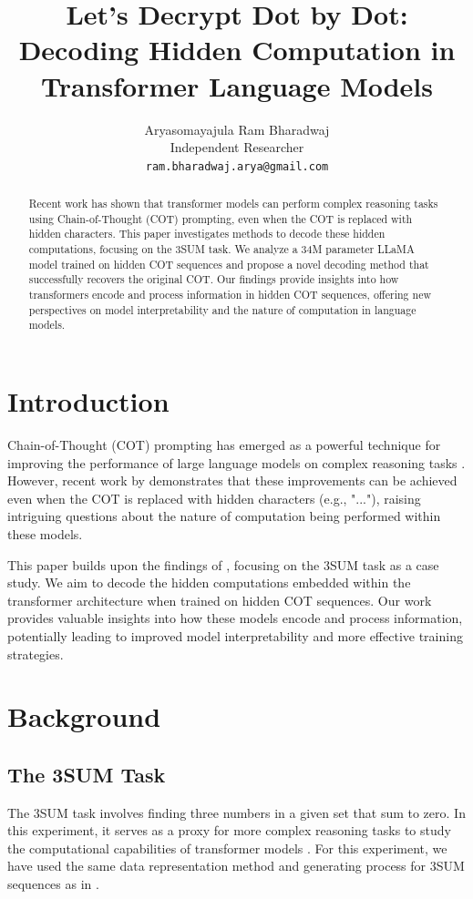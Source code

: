 \documentclass{article}
\title{Let's Decrypt Dot by Dot: Decoding Hidden Computation in Transformer Language Models}
\author{
  Aryasomayajula Ram Bharadwaj \\
  Independent Researcher \\
  \texttt{ram.bharadwaj.arya@gmail.com}
}
\begin{document}
\maketitle

\begin{abstract}
Recent work has shown that transformer models can perform complex reasoning tasks using Chain-of-Thought (COT) prompting, even when the COT is replaced with hidden characters. This paper investigates methods to decode these hidden computations, focusing on the 3SUM task. We analyze a 34M parameter LLaMA model trained on hidden COT sequences and propose a novel decoding method that successfully recovers the original COT. Our findings provide insights into how transformers encode and process information in hidden COT sequences, offering new perspectives on model interpretability and the nature of computation in language models.
\end{abstract}

\section{Introduction}
Chain-of-Thought (COT) prompting has emerged as a powerful technique for improving the performance of large language models on complex reasoning tasks \cite{wei2022chain}. However, recent work by \cite{pfau2023let} demonstrates that these improvements can be achieved even when the COT is replaced with hidden characters (e.g., "..."), raising intriguing questions about the nature of computation being performed within these models.

This paper builds upon the findings of \cite{pfau2023let}, focusing on the 3SUM task as a case study. We aim to decode the hidden computations embedded within the transformer architecture when trained on hidden COT sequences. Our work provides valuable insights into how these models encode and process information, potentially leading to improved model interpretability and more effective training strategies.

\section{Background}

\subsection{The 3SUM Task}
The 3SUM task involves finding three numbers in a given set that sum to zero. In this experiment, it serves as a proxy for more complex reasoning tasks to study the computational capabilities of transformer models \cite{wei2022chain}. For this experiment, we have used the same data representation method and generating process for 3SUM sequences as in \cite{wei2022chain}.
\end{document}

